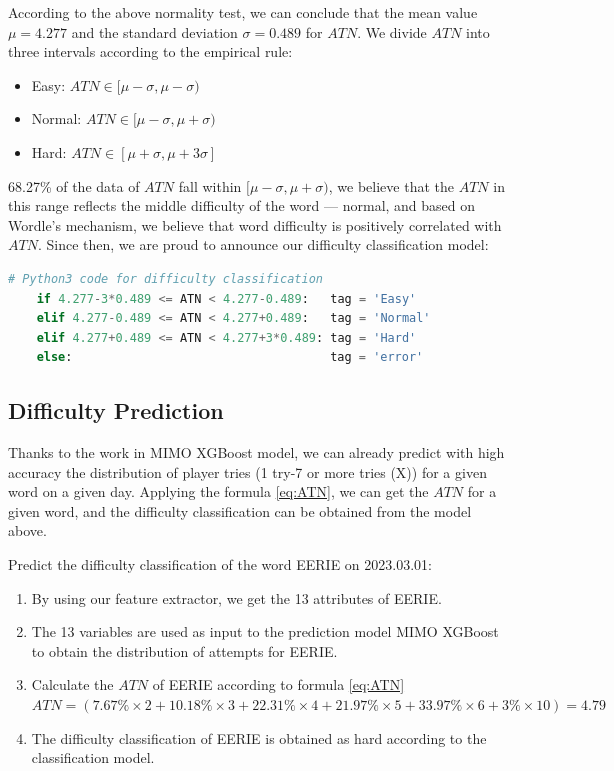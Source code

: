 \documentclass[12pt]{article}  %
\begin{document}
According to the above normality test, we can conclude that the mean value $\mu = 4.277$ and the standard deviation $\sigma = 0.489$ for $ATN$. We divide $ATN$ into three intervals according to the empirical rule:

\begin{itemize}
    \item Easy: $ATN \in [\mu - \sigma, \mu - \sigma)$
    \item Normal: $ATN \in [\mu - \sigma, \mu + \sigma)$
    \item Hard: $ATN \in [\mu + \sigma, \mu + 3\sigma]$
\end{itemize}

68.27\% of the data of $ATN$ fall within $[\mu - \sigma, \mu + \sigma)$, we believe that the $ATN$ in this range reflects the middle difficulty of the word --- normal, and based on Wordle's mechanism, we believe that word difficulty is positively correlated with $ATN$. Since then, we are proud to announce our difficulty classification model:

\begin{lstlisting}[language=Python, name={classification.py}]
    # Python3 code for difficulty classification
    if 4.277-3*0.489 <= ATN < 4.277-0.489:   tag = 'Easy'
    elif 4.277-0.489 <= ATN < 4.277+0.489:   tag = 'Normal'
    elif 4.277+0.489 <= ATN < 4.277+3*0.489: tag = 'Hard'
    else:                                    tag = 'error'
\end{lstlisting}


\subsection{Difficulty Prediction}
Thanks to the work in MIMO XGBoost model, we can already predict with high accuracy the distribution of player tries (1 try-7 or more tries (X)) for a given word on a given day. Applying the formula \ref{eq:ATN}, we can get the $ATN$ for a given word, and the difficulty classification can be obtained from the model above.

Predict the difficulty classification of the word EERIE on 2023.03.01:
\begin{enumerate}
    \item By using our feature extractor, we get the 13 attributes of EERIE.
    \item The 13 variables are used as input to the prediction model MIMO XGBoost to obtain the distribution of attempts for EERIE.
    \item Calculate the $ATN$ of EERIE according to formula \ref{eq:ATN} $ATN= (7.67\% \times 2 + 10.18\% \times 3 + 22.31\% \times 4 + 21.97\% \times 5 + 33.97\% \times 6 + 3\% \times 10) = 4.79$
    \item The difficulty classification of EERIE is obtained as hard according to the classification model.
\end{enumerate}
\end{document}
